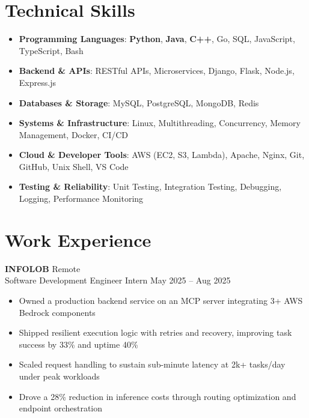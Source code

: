 \documentclass[letterpaper,10pt]{article}
\newcommand{\skillentry}[2]{%
    \textbf{#1}: #2\\%
}
\begin{document}
\section*{Technical Skills}
\vspace{-5pt}
\RaggedRight
\begin{itemize}[leftmargin=*,label=\textbullet,after=\vspace{-5pt}] %
    \item \skillentry{Programming Languages}{\textbf{Python}, \textbf{Java}, \textbf{C++}, Go, SQL, JavaScript, TypeScript, Bash}
    \item \skillentry{Backend \& APIs}{RESTful APIs, Microservices, Django, Flask, Node.js, Express.js}
    \item \skillentry{Databases \& Storage}{MySQL, PostgreSQL, MongoDB, Redis}
    \item \skillentry{Systems \& Infrastructure}{Linux, Multithreading, Concurrency, Memory Management, Docker, CI/CD}
    \item \skillentry{Cloud \& Developer Tools}{AWS (EC2, S3, Lambda), Apache, Nginx, Git, GitHub, Unix Shell, VS Code}
    \item \skillentry{Testing \& Reliability}{Unit Testing, Integration Testing, Debugging, Logging, Performance Monitoring}
\end{itemize}

\section*{Work Experience}
\vspace{-5pt}
\RaggedRight

\textbf{INFOLOB} \hfill Remote \\
Software Development Engineer Intern \hfill May 2025 – Aug 2025
\begin{itemize}[leftmargin=*,label=\textbullet]
    \item Owned a production backend service on an MCP server integrating 3+ AWS Bedrock components
    \item Shipped resilient execution logic with retries and recovery, improving task success by 33\% and uptime 40\%
    \item Scaled request handling to sustain sub-minute latency at 2k+ tasks/day under peak workloads
    \item Drove a 28\% reduction in inference costs through routing optimization and endpoint orchestration
\end{itemize}
\end{document}
